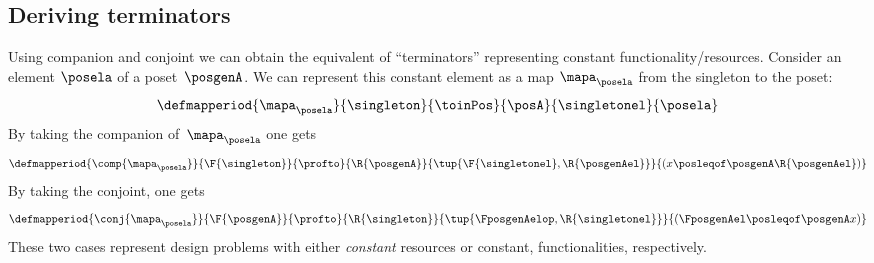 \subsection{Deriving terminators}
Using companion and conjoint we can obtain the equivalent of ``terminators'' representing constant functionality/resources.
Consider an element $\posela$ of a poset~$\posgenA$.
We can represent this constant element as a map $\mapa_{\posela}$ from the singleton to the poset:
%
\begin{equation}
    \defmapperiod{
        \mapa_{\posela}
    }{
        \singleton
    }{
        \toinPos
    }{
        \posA
    }{
        \singletonel
    }{
        \posela
    }
\end{equation}
%
By taking the companion of~$\mapa_{\posela}$ one gets
%
\begin{equation}
    \defmapperiod{
        \comp{\mapa_{\posela}}
    }{
        \F{\singleton}
    }{
        \profto
    }{
        \R{\posgenA}
    }{
        \tup{\F{\singletonel},\R{\posgenAel}}
    }{
        ( x \posleqof\posgenA \R{\posgenAel})
    }
\end{equation}
By taking the conjoint, one gets
\begin{equation}
    \defmapperiod{
        \conj{\mapa_{\posela}}
    }{
        \F{\posgenA}
    }{
        \profto
    }{
        \R{\singleton}
    }{
        \tup{\FposgenAelop,\R{\singletonel}}
    }{
        (\FposgenAel\posleqof\posgenA x)
    }
\end{equation}
These two cases represent design problems with either \emph{constant} resources or constant, functionalities, respectively.
